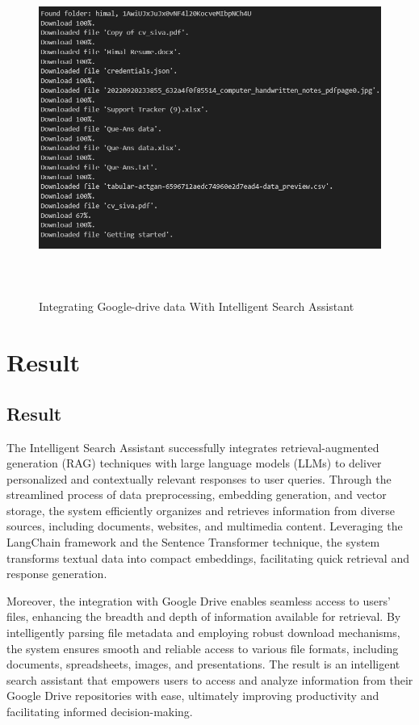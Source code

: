 \documentclass[12pt,a4paper,oneside]{report}
\begin{document}
\begin{figure}[ht]
    \centering
    \includegraphics[width=145mm , height = 110mm]{images/google-drive.png}
    \caption{Integrating Google-drive data With Intelligent Search Assistant}
    \label{fig:figure2_2}
\end{figure}

\newpage
\chapter{Result}
\section{Result}
\par The Intelligent Search Assistant successfully integrates retrieval-augmented generation (RAG) techniques with large language models (LLMs) to deliver personalized and contextually relevant responses to user queries. Through the streamlined process of data preprocessing, embedding generation, and vector storage, the system efficiently organizes and retrieves information from diverse sources, including documents, websites, and multimedia content. Leveraging the LangChain framework and the Sentence Transformer technique, the system transforms textual data into compact embeddings, facilitating quick retrieval and response generation.

Moreover, the integration with Google Drive enables seamless access to users' files, enhancing the breadth and depth of information available for retrieval. By intelligently parsing file metadata and employing robust download mechanisms, the system ensures smooth and reliable access to various file formats, including documents, spreadsheets, images, and presentations. The result is an intelligent search assistant that empowers users to access and analyze information from their Google Drive repositories with ease, ultimately improving productivity and facilitating informed decision-making.
\end{document}
